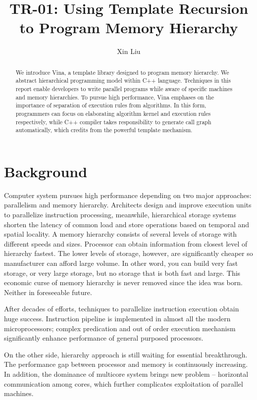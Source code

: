 \documentclass[a4paper, 11pt]{article}
\author{Xin Liu}
\title{TR-01: Using Template Recursion to Program Memory Hierarchy}
\begin{document}
\begin{abstract}
We introduce Vina, a template library designed to program memory hierarchy. We abstract hierarchical programming model within C++ language. Techniques in this report enable developers to 
write parallel programs while aware of specific machines and
memory hierarchies. To pursue high performance, Vina
emphases on the importance of separation of execution rules from
algorithms. In this form, programmers can focus on elaborating algorithm kernel and execution rules respectively, while C++ compiler takes responsibility to generate call graph
automatically, which credits from the powerful template mechanism.
\end{abstract}

\maketitle
\section{Background}
Computer system pursues high performance depending on two major approaches: parallelism and memory hierarchy.  Architects design and 
improve execution units to parallelize instruction processing, meanwhile, hierarchical storage systems shorten the latency of common load and
store operations based on temporal and spatial locality. A memory hierarchy consists of several levels of storage
with different speeds and sizes. Processor can obtain information from
closest level of hierarchy fastest. The lower levels of storage, however, are significantly cheaper so manufacturer can afford large volume.  In other word, you can build very fast storage, or very large storage, but no
storage that is both fast and large. This economic curse of memory hierarchy is never removed since the idea was born. Neither in
foreseeable future.

After decades of efforts, techniques to parallelize
instruction execution obtain huge success. Instruction pipeline is
implemented in almost all the modern microprocessors;  complex
predication and out of order execution mechanism significantly enhance performance of general purposed processors. 

On the other side, hierarchy approach is still waiting for essential breakthrough. The performance gap between processor and memory
is continuously increasing. In addition, the dominance of multicore system brings new problem -- horizontal communication among cores,
which further complicates exploitation of parallel machines.
\end{document}
